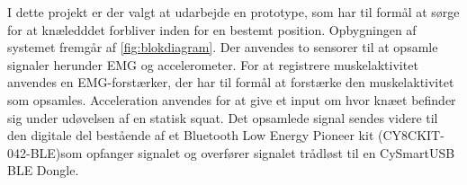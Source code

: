 I dette projekt er der valgt at udarbejde en prototype, som har til formål at sørge for at knæledddet forbliver inden for en bestemt position. Opbygningen af systemet fremgår af \autoref{fig:blokdiagram}. Der anvendes to sensorer til at opsamle signaler herunder EMG og accelerometer. For at registrere muskelaktivitet anvendes en EMG-forstærker, der har til formål at forstærke den muskelaktivitet som opsamles. Acceleration anvendes for at give et input om hvor knæet befinder sig under udøvelsen af en statisk squat. Det opsamlede signal sendes videre til den digitale del bestående af et Bluetooth Low Energy Pioneer kit (CY8CKIT-042-BLE)som opfanger signalet og overfører signalet trådløst til en CySmartUSB BLE Dongle. 

